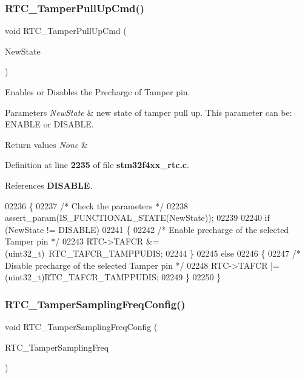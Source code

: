 \subsubsection{R\+T\+C\+\_\+\+Tamper\+Pull\+Up\+Cmd()}
{\footnotesize\ttfamily void R\+T\+C\+\_\+\+Tamper\+Pull\+Up\+Cmd (\begin{DoxyParamCaption}\item[{\textbf{ Functional\+State}}]{New\+State }\end{DoxyParamCaption})}



Enables or Disables the Precharge of Tamper pin. 


\begin{DoxyParams}{Parameters}
{\em New\+State} & new state of tamper pull up. This parameter can be\+: E\+N\+A\+B\+LE or D\+I\+S\+A\+B\+LE. \\
\hline
\end{DoxyParams}

\begin{DoxyRetVals}{Return values}
{\em None} & \\
\hline
\end{DoxyRetVals}


Definition at line \textbf{ 2235} of file \textbf{ stm32f4xx\+\_\+rtc.\+c}.



References \textbf{ D\+I\+S\+A\+B\+LE}.


\begin{DoxyCode}
02236 \{
02237   \textcolor{comment}{/* Check the parameters */}
02238   assert_param(IS_FUNCTIONAL_STATE(NewState));
02239   
02240  \textcolor{keywordflow}{if} (NewState != DISABLE)
02241   \{
02242     \textcolor{comment}{/* Enable precharge of the selected Tamper pin */}
02243     RTC->TAFCR &= (uint32\_t)~RTC_TAFCR_TAMPPUDIS; 
02244   \}
02245   \textcolor{keywordflow}{else}
02246   \{
02247     \textcolor{comment}{/* Disable precharge of the selected Tamper pin */}
02248     RTC->TAFCR |= (uint32\_t)RTC_TAFCR_TAMPPUDIS;    
02249   \} 
02250 \}
\end{DoxyCode}
\mbox{\label{group__RTC__Group9_gadc7f33a31df80b5deac313fc8af8d7f7}} 
\subsubsection{R\+T\+C\+\_\+\+Tamper\+Sampling\+Freq\+Config()}
{\footnotesize\ttfamily void R\+T\+C\+\_\+\+Tamper\+Sampling\+Freq\+Config (\begin{DoxyParamCaption}\item[{uint32\+\_\+t}]{R\+T\+C\+\_\+\+Tamper\+Sampling\+Freq }\end{DoxyParamCaption})}



